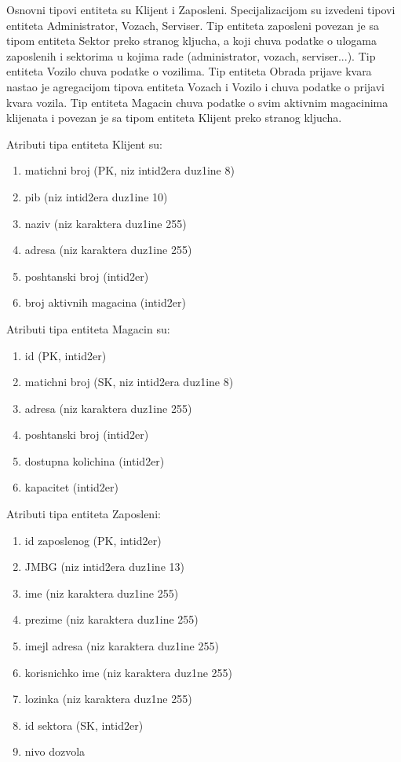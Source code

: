 

Osnovni tipovi entiteta su Klijent i Zaposleni. Specijalizacijom su izvedeni tipovi entiteta Administrator, Vozach, Serviser. Tip entiteta zaposleni povezan je sa tipom entiteta Sektor preko stranog kljucha, a koji chuva podatke o ulogama zaposlenih i sektorima u kojima rade (administrator, vozach, serviser...). Tip entiteta Vozilo chuva podatke o vozilima. Tip entiteta Obrada prijave kvara nastao je agregacijom tipova entiteta Vozach i Vozilo i chuva podatke o prijavi kvara vozila. Tip entiteta Magacin chuva podatke o svim aktivnim magacinima klijenata i povezan je sa tipom entiteta Klijent preko stranog kljucha.

Atributi tipa entiteta Klijent su:
\begin{enumerate}
    \item{matichni broj (PK, niz intid2era duz1ine 8)}
    \item{pib (niz intid2era duz1ine 10)}
    \item{naziv (niz karaktera duz1ine 255)}
    \item{adresa (niz karaktera duz1ine 255)}
    \item{poshtanski broj (intid2er)}
    \item{broj aktivnih magacina (intid2er)}
\end{enumerate}


Atributi tipa entiteta Magacin su:
\begin{enumerate}
    \item{id (PK, intid2er)}
    \item{matichni broj (SK, niz intid2era duz1ine 8)}
    \item{adresa (niz karaktera duz1ine 255)}
    \item{poshtanski broj (intid2er)}
    \item{dostupna kolichina (intid2er)}
    \item{kapacitet (intid2er)}
\end{enumerate}

Atributi tipa entiteta Zaposleni:
\begin{enumerate}
    \item {id zaposlenog (PK, intid2er)}
    \item{JMBG (niz intid2era duz1ine 13)}
    \item{ime (niz karaktera duz1ine 255)}
    \item{prezime (niz karaktera duz1ine 255)}
    \item{imejl adresa (niz karaktera duz1ine 255)}
    \item{korisnichko ime (niz karaktera duz1ne 255)}
    \item{lozinka (niz karaktera duz1ne 255)}
    \item{id sektora (SK, intid2er)}
    \item{nivo dozvola}
\end{enumerate}

